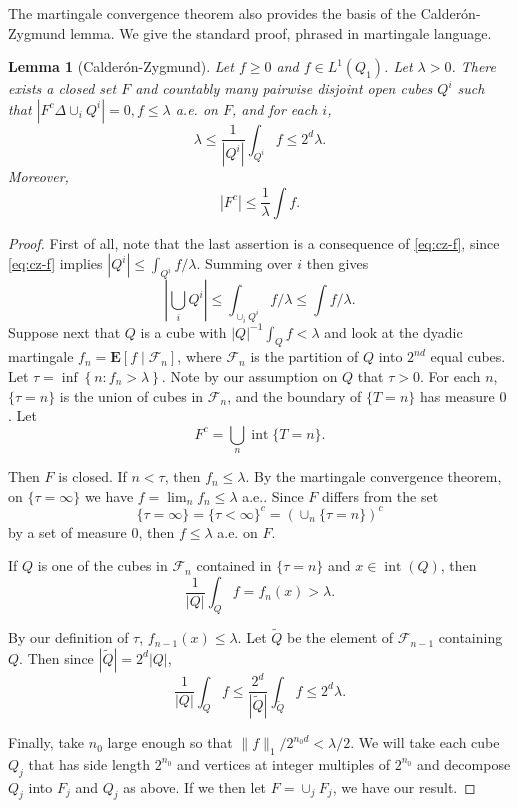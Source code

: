 \documentclass[twoside, 12pt]{book}
\numberwithin{equation}{chapter}
\newtheorem{lemma}[theorem]{Lemma}
\def\bE{{\mathbf E}}
\def\l{\left}
\def\r{\right}
\def\geq{\geqslant}
\def\leq{\leqslant}
\begin{document}
	
	 The martingale convergence theorem also provides the basis of the Calderón-Zygmund lemma. We give the standard proof, phrased in martingale language.
	 \begin{lemma}[Calderón-Zygmund]
	 	Let $f \geq 0$ and $f\in L^1(Q_1)$. Let $\lambda>0$. There exists a closed set $F$ and countably many pairwise disjoint open cubes $Q^i$ such that $\left|F^c \Delta \cup_i Q^i\right|=0, f \leq \lambda$ a.e. on $F$, and for each $i$,
	 	\begin{equation}\label{eq:cz-f}
	 		\lambda \leq \frac{1}{\left|Q^i\right|} \int_{Q^i} f \leq 2^d \lambda .
	 	\end{equation} 
	 	Moreover, 
	 	\[
	 	\left|F^c\right| \leq \frac{1}{\lambda} \int f .
	 	\]
	 \end{lemma}
	 \begin{proof}
	 	First of all, note that the last assertion is a consequence of \eqref{eq:cz-f}, since \eqref{eq:cz-f} implies $\left|Q^i\right| \leq \int_{Q^i} f / \lambda$. Summing over $i$ then gives 
	 	\[
	 	    \left|\bigcup_i Q^i\right| \leq\int_{\cup_i Q^i} f / \lambda \leq \int f / \lambda. 
	 	\]
	 	Suppose next that $Q$ is a cube with $|Q|^{-1} \int_Q f<\lambda$ and look at the dyadic martingale $f_n=\bE \left[f \mid \mathcal{F}_n\right]$, where $\mathcal{F}_n$ is the partition of $Q$ into $2^{n d}$ equal cubes. Let $\tau=\inf \left\{n: f_n>\lambda\right\}$. Note by our assumption on $Q$ that $\tau>0$. For each $n$, $\{\tau=n\}$ is the union of cubes in $\mathcal{F}_n$, and the boundary of $\{T=n\}$ has measure 0 . Let
	 	$$
	 	F^c=\bigcup_n \operatorname{int}\{T=n\} .
	 	$$
	 	
	 	Then $F$ is closed. If $n<\tau$, then $f_n \leq \lambda$. By the martingale convergence theorem, on $\{\tau=\infty\}$ we have $f=\lim _n f_n \leq \lambda$ a.e.. Since $F$ differs from the set
	 	\[
	 	    \{\tau=\infty\}=\{\tau<\infty\}^c=\l(\cup_n\{\tau=n\}\r)^c
	 	\]
	 	by a set of measure 0, then $f \leq \lambda$ a.e. on $F$.
	 	
	 	If $Q$ is one of the cubes in $\mathcal{F}_n$ contained in $\{\tau=n\}$ and $x \in \operatorname{int}(Q)$, then
	 	$$
	 	\frac{1}{|Q|} \int_Q f=f_n(x)>\lambda .
	 	$$
	 	
	 	By our definition of $\tau$, $f_{n-1}(x) \leq \lambda$. Let $\widetilde{Q}$ be the element of $\mathcal{F}_{n-1}$ containing $Q$. Then since $\left|\widetilde{Q}\right|=2^d|Q|$,
	 	$$
	 	\frac{1}{|Q|} \int_Q f \leq \frac{2^d}{\left|\widetilde{Q}\right|} \int_{\widetilde{Q}} f \leq 2^d \lambda .
	 	$$
	 	
	 	Finally, take $n_0$ large enough so that $\|f\|_1 / 2^{n_0 d}<\lambda / 2$. We will take each cube $Q_j$ that has side length $2^{n_0}$ and vertices at integer multiples of $2^{n_0}$ and decompose $Q_j$ into $F_j$ and $Q_j$ as above. If we then let $F=\cup_j F_j$, we have our result.
	 \end{proof}
	
\end{document}
